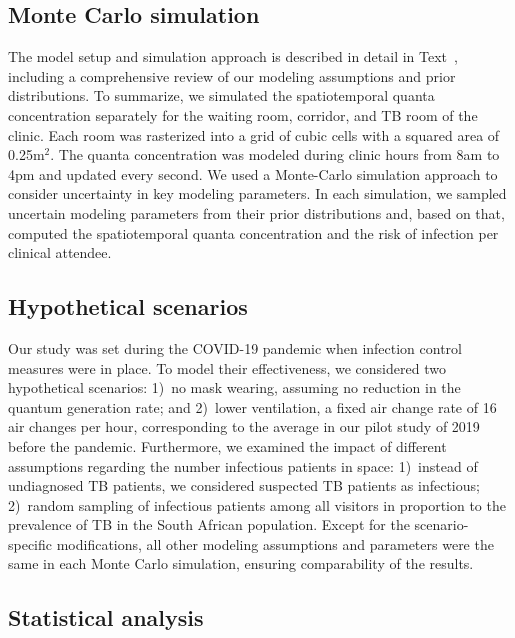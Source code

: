 \documentclass[fleqn,11pt]{wlscirep}
\begin{document}
\subsection{Monte Carlo simulation}

The model setup and simulation approach is described in detail in Text~, including a comprehensive review of our modeling assumptions and prior distributions. To summarize, we simulated the spatiotemporal quanta concentration separately for the waiting room, corridor, and TB room of the clinic. Each room was rasterized into a grid of cubic cells with a squared area of 0.25m$^2$. The quanta concentration was modeled during clinic hours from 8am to 4pm and updated every second. We used a Monte-Carlo simulation approach to consider uncertainty in key modeling parameters. In each simulation, we sampled uncertain modeling parameters from their prior distributions and, based on that, computed the spatiotemporal quanta concentration and the risk of infection per clinical attendee. 

\subsection{Hypothetical scenarios}

Our study was set during the COVID-19 pandemic when infection control measures were in place. To model their effectiveness, we considered two hypothetical scenarios: 1)~no mask wearing, \ie assuming no reduction in the quantum generation rate; and 2)~lower ventilation, \ie a fixed air change rate of 16 air changes per hour, corresponding to the average in our pilot study of 2019 before the pandemic\cite{Zurcher2022JID}. Furthermore, we examined the impact of different assumptions regarding the number infectious patients in space: 1)~instead of undiagnosed TB patients, we considered suspected TB patients as infectious; 2)~random sampling of infectious patients among all visitors in proportion to the prevalence of TB in the South African population\cite{Moyo2022LancetID}. Except for the scenario-specific modifications, all other modeling assumptions and parameters were the same in each Monte Carlo simulation, ensuring comparability of the results. 

\subsection{Statistical analysis}
\end{document}
